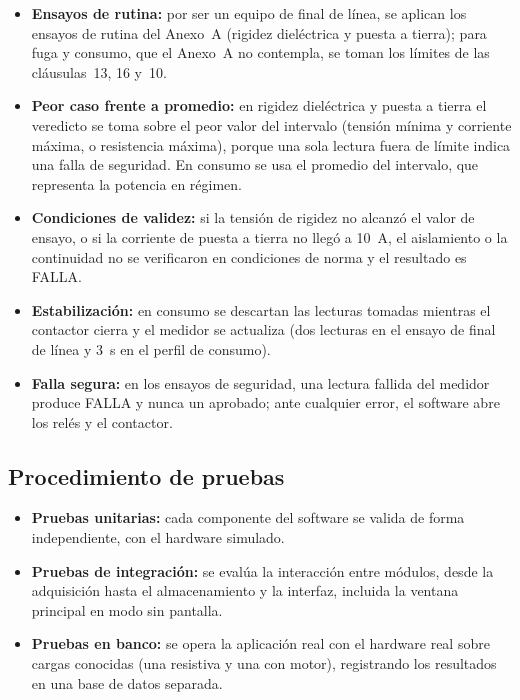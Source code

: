 \begin{itemize}
    \item \textbf{Ensayos de rutina:} por ser un equipo de final de línea, se
          aplican los ensayos de rutina del Anexo~A (rigidez dieléctrica y
          puesta a tierra); para fuga y consumo, que el Anexo~A no contempla, se
          toman los límites de las cláusulas~13, 16 y~10.
    \item \textbf{Peor caso frente a promedio:} en rigidez dieléctrica y puesta a
          tierra el veredicto se toma sobre el peor valor del intervalo (tensión
          mínima y corriente máxima, o resistencia máxima), porque una sola lectura
          fuera de límite indica una falla de seguridad. En consumo se usa el
          promedio del intervalo, que representa la potencia en régimen.
    \item \textbf{Condiciones de validez:} si la tensión de rigidez no alcanzó el
          valor de ensayo, o si la corriente de puesta a tierra no llegó a
          \SI{10}{\ampere}, el aislamiento o la continuidad no se verificaron en
          condiciones de norma y el resultado es FALLA.
    \item \textbf{Estabilización:} en consumo se descartan las lecturas tomadas
          mientras el contactor cierra y el medidor se actualiza (dos lecturas en
          el ensayo de final de línea y \SI{3}{\second} en el perfil de consumo).
    \item \textbf{Falla segura:} en los ensayos de seguridad, una lectura fallida
          del medidor produce FALLA y nunca un aprobado; ante cualquier error, el
          software abre los relés y el contactor.
\end{itemize}

\subsection{Procedimiento de pruebas}
\label{subsec:procedimiento_pruebas}

\begin{itemize}
    \item \textbf{Pruebas unitarias:} cada componente del software se valida de
          forma independiente, con el hardware simulado.
    \item \textbf{Pruebas de integración:} se evalúa la interacción entre módulos,
          desde la adquisición hasta el almacenamiento y la interfaz, incluida la
          ventana principal en modo sin pantalla.
    \item \textbf{Pruebas en banco:} se opera la aplicación real con el hardware
          real sobre cargas conocidas (una resistiva y una con motor), registrando
          los resultados en una base de datos separada.
\end{itemize}
